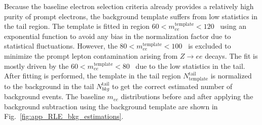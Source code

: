 Because the baseline electron selection criteria already provides a relatively high purity of prompt electrons, the background template suffers from low statistics in the tail region.
The template is fitted in region $60 < m_{ee}^\mathrm{template} < 120$~{\GeV} using an exponential function to avoid any bias in the normalization factor due to statistical fluctuations.
However, the $80 < m_{ee}^\mathrm{template} < 100$~{\GeV} is excluded to minimize the prompt lepton contamination arising from $Z \to ee$ decays.
The fit is mostly driven by the $60 < m_{ee}^\mathrm{template} < 80$~{\GeV} due to the low statistics in the tail.
After fitting is performed, the template in the tail region $N_\mathrm{template}^\mathrm{tail}$ is normalized to the background in the tail $N_{bkg}^\mathrm{tail}$ to get the correct estimated number of background events.
The baseline $m_{ee}$ distributions before and after applying the background subtraction using the background template are shown in Fig.~\ref{fig:app_RLE_bkg_estimations}.
%
